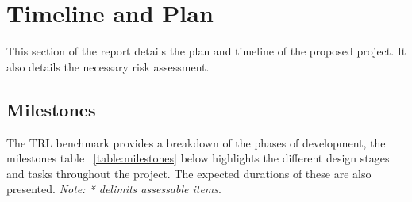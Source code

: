 
\chapter[Timeline and Plan]{Timeline and Plan}
\label{Chap:label}	%
\pagestyle{headings}



This section of the report details the plan and timeline of the proposed project. It also details the necessary risk assessment.


\section{Milestones}
\label{Sec:label}	%

The TRL benchmark provides a breakdown of the phases of development, the milestones table ~\ref{table:milestones} below highlights the different design 
stages and tasks throughout the project. The expected durations of these are also presented. \textit{Note: * delimits assessable items}.
  

